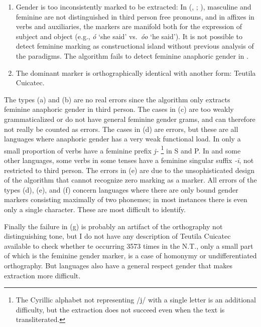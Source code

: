 \documentclass[output=collectionpaper]{langsci/langscibook}
\begin{document}
\begin{enumerate}[label=(\alph*)]
\item
Gender is too inconsistently marked to be extracted: In  (, ; \citealt{Mous1992}), masculine and feminine are not distinguished in third person free pronouns, and in affixes in verbs and auxiliaries, the markers are manifold both for the expression of subject and object (e.g., \textit{ó\textquotesingle} ‘she said’ vs.\ \textit{óo\textquotesingle} ‘he said’). It is not possible to detect feminine marking as constructional island without previous analysis of the paradigms. The algorithm fails to detect feminine anaphoric gender in .
\item
The dominant marker is orthographically identical with another form: Teutila Cuicatec.
\end{enumerate}

The types (a) and (b) are no real errors since the algorithm only extracts feminine anaphoric gender in third person. The cases in (c) are too weakly grammaticalized or do not have general feminine gender grams, and can therefore not really be counted as errors. The cases in (d) are errors, but these are all languages where anaphoric gender has a very weak functional load. In  only a small proportion of verbs have a feminine prefix \textit{j-}%
\footnote{%
The Cyrillic alphabet not representing /j/ with a single letter is an additional difficulty, but the extraction does not succeed even when the text is transliterated.
} %
in S and P. In  and some other  languages, some verbs in some tenses have a feminine singular suffix \textit{-ī}, not restricted to third person. The errors in (e) are due to the unsophisticated design of the algorithm that cannot recognize zero marking as a marker. All errors of the types (d), (e), and (f) concern languages where there are only bound gender markers consisting maximally of two phonemes; in most instances there is even only a single character. These are most difficult to identify.

Finally the failure in (g) is probably an artifact of the orthography not distinguishing tone, but I do not have any description of Teutila Cuicatec available to check whether te occurring 3573 times in the N.T., only a small part of which is the feminine gender marker, is a case of homonymy or undifferentiated orthography. But  languages also have a general respect gender that makes extraction more difficult.
\end{document}
